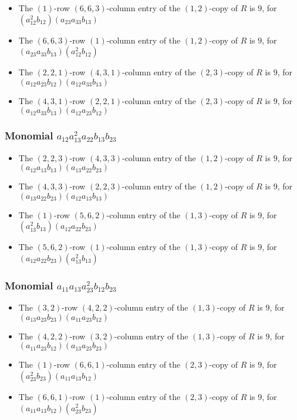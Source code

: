 \documentclass{article}
\begin{document}
\begin{itemize}
\item The $(1)$-row $(6, 6, 3)$-column entry of the $ \left(1, 2\right) $-copy of $R$ is $ 9 $, for $( a_{12}^{2} b_{12} )( a_{23} a_{33} b_{13} )$ 
\item The $(6, 6, 3)$-row $(1)$-column entry of the $ \left(1, 2\right) $-copy of $R$ is $ 9 $, for $( a_{23} a_{33} b_{13} )( a_{12}^{2} b_{12} )$ 
\item The $(2, 2, 1)$-row $(4, 3, 1)$-column entry of the $ \left(2, 3\right) $-copy of $R$ is $ 9 $, for $( a_{12} a_{23} b_{12} )( a_{12} a_{33} b_{13} )$ 
\item The $(4, 3, 1)$-row $(2, 2, 1)$-column entry of the $ \left(2, 3\right) $-copy of $R$ is $ 9 $, for $( a_{12} a_{33} b_{13} )( a_{12} a_{23} b_{12} )$ 
\end{itemize}
\subsubsection{Monomial $ a_{12} a_{13}^{2} a_{22} b_{13} b_{23} $}

\begin{itemize}
\item The $(2, 2, 3)$-row $(4, 3, 3)$-column entry of the $ \left(1, 2\right) $-copy of $R$ is $ 9 $, for $( a_{12} a_{13} b_{13} )( a_{13} a_{22} b_{23} )$ 
\item The $(4, 3, 3)$-row $(2, 2, 3)$-column entry of the $ \left(1, 2\right) $-copy of $R$ is $ 9 $, for $( a_{13} a_{22} b_{23} )( a_{12} a_{13} b_{13} )$ 
\item The $(1)$-row $(5, 6, 2)$-column entry of the $ \left(1, 3\right) $-copy of $R$ is $ 9 $, for $( a_{13}^{2} b_{13} )( a_{12} a_{22} b_{23} )$ 
\item The $(5, 6, 2)$-row $(1)$-column entry of the $ \left(1, 3\right) $-copy of $R$ is $ 9 $, for $( a_{12} a_{22} b_{23} )( a_{13}^{2} b_{13} )$ 
\end{itemize}
\subsubsection{Monomial $ a_{11} a_{13} a_{23}^{2} b_{12} b_{23} $}

\begin{itemize}
\item The $(3, 2)$-row $(4, 2, 2)$-column entry of the $ \left(1, 3\right) $-copy of $R$ is $ 9 $, for $( a_{13} a_{23} b_{23} )( a_{11} a_{23} b_{12} )$ 
\item The $(4, 2, 2)$-row $(3, 2)$-column entry of the $ \left(1, 3\right) $-copy of $R$ is $ 9 $, for $( a_{11} a_{23} b_{12} )( a_{13} a_{23} b_{23} )$ 
\item The $(1)$-row $(6, 6, 1)$-column entry of the $ \left(2, 3\right) $-copy of $R$ is $ 9 $, for $( a_{23}^{2} b_{23} )( a_{11} a_{13} b_{12} )$ 
\item The $(6, 6, 1)$-row $(1)$-column entry of the $ \left(2, 3\right) $-copy of $R$ is $ 9 $, for $( a_{11} a_{13} b_{12} )( a_{23}^{2} b_{23} )$ 
\end{itemize}
\end{document}

